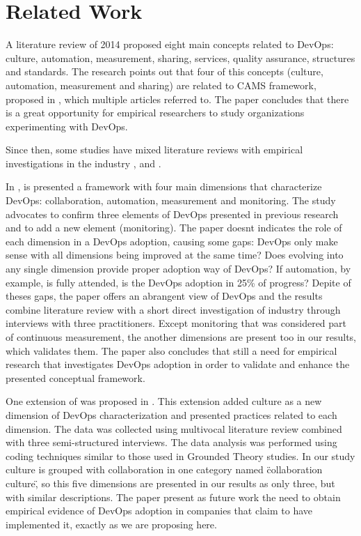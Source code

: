\section{Related Work}

A literature review of 2014 \cite{cooperation_dev_ops_esem_2014} proposed eight
main concepts related to DevOps: culture, automation, measurement, sharing,
services, quality assurance, structures and standards.
The research points out that four of this concepts (culture, automation,
measurement and sharing) are related to CAMS framework, proposed in
\cite{what_devops_means_2010}, which multiple articles referred to.
The paper concludes that there is a great opportunity for empirical researchers
to study organizations experimenting with DevOps.

Since then, some studies have mixed literature reviews with empirical
investigations in the industry \cite{devops_a_definition_xp_15},
\cite{qualitative_devops_journalsw_17} and \cite{dimensions_of_devops_xp_15}.

In \cite{dimensions_of_devops_xp_15}, is presented a framework with four main
dimensions that characterize DevOps: collaboration, automation, measurement and
monitoring. The study advocates to confirm three elements of DevOps presented
in previous research and to add a new element (monitoring). The paper doesnt
indicates the role of each dimension in a DevOps adoption, causing some gaps:
DevOps only make sense with all dimensions being improved at the same time?
Does evolving into any single dimension provide proper adoption way of DevOps?
If automation, by example, is fully attended, is the DevOps adoption in 25\% of
progress? Depite of theses gaps, the paper offers an abrangent view of DevOps
and the results combine literature review with a short direct investigation of
industry through interviews with three practitioners. Except monitoring that
was considered part of continuous measurement, the another dimensions are
present too in our results, which validates them. The paper also concludes
that still a need for empirical research that investigates DevOps adoption in
order to validate and enhance the presented conceptual framework.

One extension of \cite{dimensions_of_devops_xp_15} was proposed in
\cite{extending_dimensions_icsea_16}. This extension added culture as a new
dimension of DevOps characterization and presented practices related to each
dimension. The data was collected using multivocal literature review combined
with three semi-structured interviews. The data analysis was performed using
coding techniques similar to those used in Grounded Theory studies. In our study
culture is grouped with collaboration in one category named \"collaboration
culture\", so this five dimensions are presented in our results as only three,
but with similar descriptions. The paper present as future work the need to
obtain empirical evidence of DevOps adoption in companies that claim to have
implemented it, exactly as we are proposing here.

